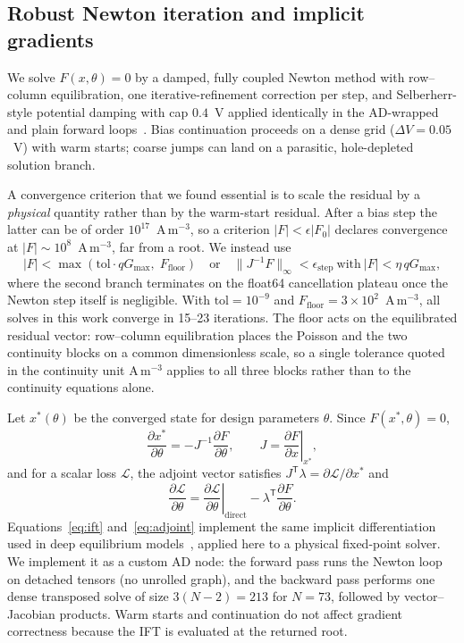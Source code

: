 \documentclass[preprint,12pt]{elsarticle}
\newcommand{\pder}[2]{\frac{\partial #1}{\partial #2}}
\begin{document}
\subsection{Robust Newton iteration and implicit gradients}
\label{sec:newton}

We solve $F(x,\theta)=0$ by a damped, fully coupled Newton method with row--
column equilibration, one iterative-refinement correction per step, and
Selberherr-style potential damping with cap $0.4$~V applied
identically in the AD-wrapped and plain forward loops~\cite{selberherr1984}.
Bias continuation proceeds on a dense grid ($\Delta V=0.05$~V) with warm
starts; coarse jumps can land on a parasitic, hole-depleted solution branch.

A convergence criterion that we found essential is to scale the residual by
a \emph{physical} quantity rather than by the warm-start residual. After a
bias step the latter can be of order $10^{17}$~A\,m$^{-3}$, so a criterion
$|F|<\epsilon|F_0|$ declares convergence at $|F|\sim10^{8}$~A\,m$^{-3}$,
far from a root. We instead use
\begin{equation}
  |F| < \max\!\left(\mathrm{tol}\cdot qG_{\max},\; F_{\mathrm{floor}}\right)
  \quad\text{or}\quad
  \|J^{-1}F\|_{\infty} < \epsilon_{\mathrm{step}}
  \ \text{with}\ |F| < \eta\, qG_{\max},
  \label{eq:convergence}
\end{equation}
where the second branch terminates on the float64 cancellation plateau once
the Newton step itself is negligible. With $\mathrm{tol}=10^{-9}$ and
$F_{\mathrm{floor}}=3\times10^{2}$~A\,m$^{-3}$, all solves in this work
converge in 15--23 iterations. The floor acts on the equilibrated
residual vector: row--column equilibration places the Poisson and the
two continuity blocks on a common dimensionless scale, so a single
tolerance quoted in the continuity unit A\,m$^{-3}$ applies to all
three blocks rather than to the continuity equations alone.

Let $x^{*}(\theta)$ be the converged state for design parameters $\theta$.
Since $F(x^{*},\theta)=0$,
\begin{equation}
  \pder{x^{*}}{\theta}=-J^{-1}\pder{F}{\theta},\qquad
  J=\left.\pder{F}{x}\right|_{x^{*}},
  \label{eq:ift}
\end{equation}
and for a scalar loss $\mathcal{L}$, the adjoint vector satisfies
$J^{\mathsf T}\lambda=\partial\mathcal{L}/\partial x^{*}$ and
\begin{equation}
  \pder{\mathcal{L}}{\theta}
  = \left.\pder{\mathcal{L}}{\theta}\right|_{\mathrm{direct}}
    - \lambda^{\mathsf T}\pder{F}{\theta}.
  \label{eq:adjoint}
\end{equation}
Equations~\eqref{eq:ift} and~\eqref{eq:adjoint} implement the same implicit
differentiation used in deep equilibrium models~\cite{bai2019}, applied
here to a physical fixed-point solver. We
implement it as a custom AD node: the forward pass runs the Newton loop on
detached tensors (no unrolled graph), and the backward pass performs one
dense transposed solve of size $3(N-2)=213$ for $N=73$, followed by
vector--Jacobian products. Warm starts and continuation do not affect
gradient correctness because the IFT is evaluated at the returned root.
\end{document}

